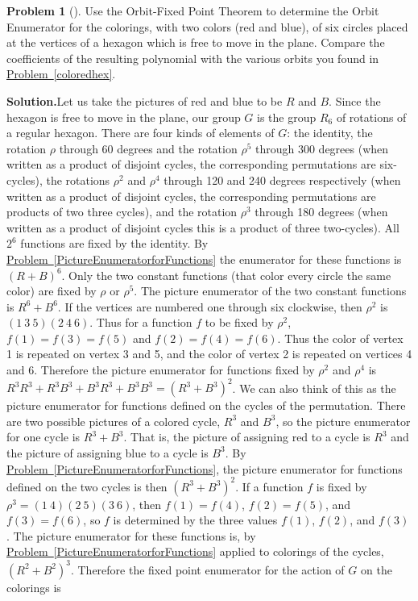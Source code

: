 \documentclass[10pt,]{book}
\theoremstyle{plain}
\theoremstyle{definition}
\newtheorem{activity}[project]{Problem}
\theoremstyle{definition}
\numberwithin{equation}{chapter}
\begin{document}
\begin{activity}[]\label{polya1}
Use the Orbit-Fixed Point Theorem to determine the Orbit Enumerator for the colorings, with two colors (red and blue), of six circles placed at the vertices of a hexagon which is free to move in the plane. Compare the coefficients of the resulting polynomial with the various orbits you found in \hyperref[coloredhex]{Problem~\ref{coloredhex}}.%
\par\medskip\noindent%
\textbf{Solution.}\quad Let us take the pictures of red and blue to be \(R\) and \(B\). Since the hexagon is free to move in the plane, our group \(G\) is the group \(R_6\) of rotations of a regular hexagon. There are four kinds of elements of \(G\): the identity, the rotation \(\rho\) through 60 degrees and the rotation \(\rho^5\) through 300 degrees (when written as a product of disjoint cycles, the corresponding permutations are six-cycles), the rotations \(\rho^2\) and \(\rho^4\) through 120 and 240 degrees respectively (when written as a product of disjoint cycles, the corresponding permutations are products of two three cycles), and the rotation \(\rho^3\) through 180 degrees (when written as a product of disjoint cycles this is a product of three two-cycles). All \(2^6\) functions are fixed by the identity. By \hyperref[PictureEnumeratorforFunctions]{Problem~\ref{PictureEnumeratorforFunctions}} the enumerator for these functions is \((R+B)^6\). Only the two constant functions (that color every circle the same color) are fixed by \(\rho\) or \(\rho^5\). The picture enumerator of the two constant functions is \(R^6+B^6\). If the vertices are numbered one through six clockwise, then \(\rho^2\) is \((1\ 3\ 5)(2\ 4\ 6)\). Thus for a function \(f\) to be fixed by \(\rho^2\), \(f(1)=f(3)=f(5)\) and \(f(2)=f(4)=f(6)\). Thus the color of vertex 1 is repeated on vertex 3 and 5, and the color of vertex 2 is repeated on vertices 4 and 6. Therefore the picture enumerator for functions fixed by \(\rho^2\) and \(\rho^4\) is \(R^3R^3 +R^3B^3+B^3R^3 +B^3B^3=(R^3+B^3)^2\). We can also think of this as the picture enumerator for functions defined on the cycles of the permutation. There are two possible pictures of a colored cycle, \(R^3\) and \(B^3\), so the picture enumerator for one cycle is \(R^3+B^3\). That is, the picture of assigning red to a cycle is \(R^3\) and the picture of assigning blue to a cycle is \(B^3\). By \hyperref[PictureEnumeratorforFunctions]{Problem~\ref{PictureEnumeratorforFunctions}}, the picture enumerator for functions defined on the two cycles is then \((R^3+B^3)^2\). If a function \(f\) is fixed by \(\rho^3=(1\ 4)(2\ 5)(3\ 6)\), then \(f(1)=f(4)\), \(f(2)=f(5)\), and \(f(3)=f(6)\), so \(f\) is determined by the three values \(f(1)\), \(f(2)\), and \(f(3)\). The picture enumerator for these functions is, by \hyperref[PictureEnumeratorforFunctions]{Problem~\ref{PictureEnumeratorforFunctions}} applied to colorings of the cycles, \((R^2+B^2)^3\). Therefore the fixed point enumerator for the action of \(G\) on the colorings is%

\end{activity}
\end{document}
